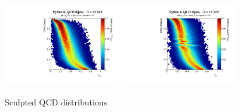 \begin{figure}[bt]
\begin{center}
{        \includegraphics[width=0.45\textwidth]{figures/tau21_convnet_back_norm_invert.pdf} \includegraphics[width=0.45\textwidth]{figures/tau21_maxout_back_norm_invert.pdf}
      }

      \caption{Sculpted QCD distributions}
      \label{fig:qcdsculpt}

    \end{center}
\end{figure}

